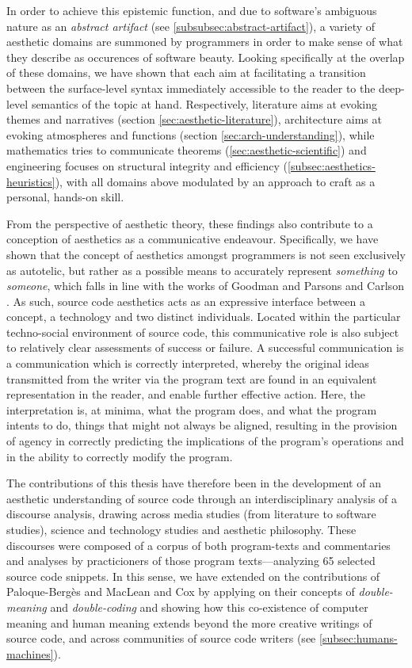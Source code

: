 In order to achieve this epistemic function, and due to software's ambiguous nature as an \emph{abstract artifact} (see \ref{subsubsec:abstract-artifact}), a variety of aesthetic domains are summoned by programmers in order to make sense of what they describe as occurences of software beauty. Looking specifically at the overlap of these domains, we have shown that each aim at facilitating a transition between the surface-level syntax immediately accessible to the reader to the deep-level semantics of the topic at hand. Respectively, literature aims at evoking themes and narratives (section \ref{sec:aesthetic-literature}), architecture aims at evoking atmospheres and functions (section \ref{sec:arch-understanding}), while mathematics tries to communicate theorems (\ref{sec:aesthetic-scientific}) and engineering focuses on structural integrity and efficiency (\ref{subsec:aesthetics-heuristics}), with all domains above modulated by an approach to craft as a personal, hands-on skill.

From the perspective of aesthetic theory, these findings also contribute to a conception of aesthetics as a communicative endeavour. Specifically, we have shown that the concept of aesthetics amongst programmers is not seen exclusively as autotelic, but rather as a possible means to accurately represent \emph{something} to \emph{someone}, which falls in line with the works of Goodman and Parsons and Carlson \citep{goodman_languages_1976,parsons_functional_2012}. As such, source code aesthetics acts as an expressive interface between a concept, a technology and two distinct individuals. Located within the particular techno-social environment of source code, this communicative role is also subject to relatively clear assessments of success or failure. A successful communication is a communication which is correctly interpreted, whereby the original ideas transmitted from the writer via the program text are found in an equivalent representation in the reader, and enable further effective action. Here, the interpretation is, at minima, what the program does, and what the program intents to do, things that might not always be aligned, resulting in the provision of agency in correctly predicting the implications of the program's operations and in the ability to correctly modify the program.

The contributions of this thesis have therefore been in the development of an aesthetic understanding of source code through an interdisciplinary analysis of a discourse analysis, drawing across media studies (from literature to software studies), science and technology studies and aesthetic philosophy. These discourses were composed of a corpus of both program-texts and commentaries and analyses by practicioners of those program texts—analyzing 65  selected source code snippets. In this sense, we have extended on the contributions of Paloque-Bergès and MacLean and Cox by applying on their concepts of \emph{double-meaning}  and \emph{double-coding} and showing how this co-existence of computer meaning and human meaning extends beyond the more creative writings of source code, and across communities of source code writers (see \ref{subsec:humans-machines}).


